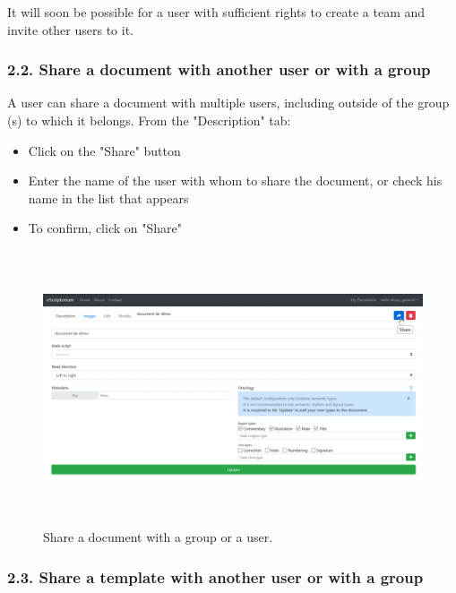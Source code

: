 \documentclass[
]{book}
\begin{document}
It will soon be possible for a user with sufficient rights to create a
team and invite other users to it.

\hypertarget{share-a-document-with-another-user-or-with-a-group}{%
\subsubsection{2.2. Share a document with another user or with a group}\label{share-a-document-with-another-user-or-with-a-group}}

A user can share a document with multiple users, including outside of
the group (s) to which it belongs. From the "Description" tab:

\begin{itemize}
\item
  Click on the "Share" button
\item
  Enter the name of the user with whom to share the document, or check
  his name in the list that appears
\item
  To confirm, click on "Share"
\end{itemize}

\begin{figure}
\centering
\includegraphics[width=6.5in,height=3.19444in]{img/eScrTut/image18.gif}
\caption{Share a document with a group or a user.}
\end{figure}

\hypertarget{share-a-template-with-another-user-or-with-a-group}{%
\subsubsection{2.3. Share a template with another user or with a group}\label{share-a-template-with-another-user-or-with-a-group}}
\end{document}
